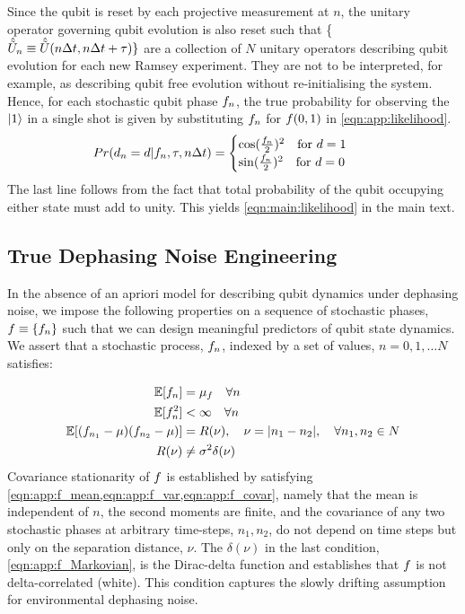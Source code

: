Since the qubit is reset by each projective measurement at $n$, the unitary operator governing qubit evolution is also reset such that \{$\hat{\tilde{U}}_n \equiv \hat{\tilde{U}}(n\Delta t, n\Delta t + \tau) \}$ are a collection of $N$ unitary operators describing qubit evolution for each new Ramsey experiment. They are not to be interpreted, for example, as describing qubit free evolution without re-initialising the system. Hence, for each stochastic qubit phase $f_n$, the true probability for observing the $| 1 \rangle$ in a single shot is given by substituting $f_n $ for $ f(0,1)$ in \cref{eqn:app:likelihood}.
\begin{align}
Pr(d_n=d | f_n, \tau, n \Delta t) &= \begin{cases} \cos(\frac{f_{n}}{2})^2 \quad \text{for $d=1$} \\   \sin(\frac{f_{n}}{2})^2  \quad \text{for $ d=0$} \end{cases} 
\end{align}
The last line follows from the fact that total probability of the qubit occupying either state must add to unity. This yields \cref{eqn:main:likelihood} in the main text.


\subsection{True Dephasing Noise Engineering \label{sec:app:truenoise}} 
In the absence of an apriori model for describing qubit dynamics under dephasing noise, we impose the following properties on a sequence of stochastic phases, $f  \equiv \{ f_n \}$ such that we can design meaningful predictors of qubit state dynamics. We assert that a stochastic process, $f_n$, indexed by a set of values, $ n = 0, 1, \hdots N $ satisfies: 

\begin{align}
\mathbb{E}[f_n] &= \mu_f \quad \forall n \label{eqn:app:f_mean} \\
\mathbb{E}[f_n^2] & < \infty \quad \forall n \label{eqn:app:f_var} \\
\mathbb{E}[(f_{n_1} - \mu)(f_{n_2} - \mu)] &= R(\nu), \quad  \nu = |n_1-n_2|, \quad \forall n_1, n_2 \in N  \label{eqn:app:f_covar} \\
R(\nu) & \neq \sigma^2  \delta(\nu) \label{eqn:app:f_Markovian} 
\end{align}
Covariance stationarity of $f$ is established by satisfying \cref{eqn:app:f_mean,eqn:app:f_var,eqn:app:f_covar}, namely that the mean is independent of $n$, the second moments are finite, and the covariance of any two stochastic phases at arbitrary time-steps, $n_1, n_2$, do not depend on time steps but only on the separation distance, $\nu$. The $\delta(\nu)$ in the last condition,   \cref{eqn:app:f_Markovian}, is the Dirac-delta function and establishes that $f$ is not delta-correlated (white). This condition captures the slowly drifting assumption for environmental dephasing noise. 


